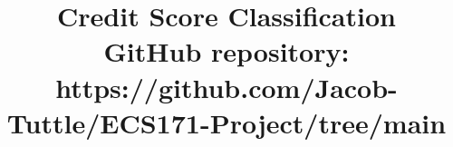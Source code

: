 \documentclass[conference, 11pt]{IEEEtran}
\begin{document}
\title{Credit Score Classification\\
{\footnotesize GitHub repository: https://github.com/Jacob-Tuttle/ECS171-Project/tree/main}
}

\author{
\and
{}
\and
{}
\and
{}
\and
{}

}

\maketitle


\end{document}
